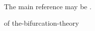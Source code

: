 

The main reference may be \cite{Ji-Xie-2026-GenusGonalitySmall}.


\begin{definition}
   of the-bifurcation-theory
\end{definition}
